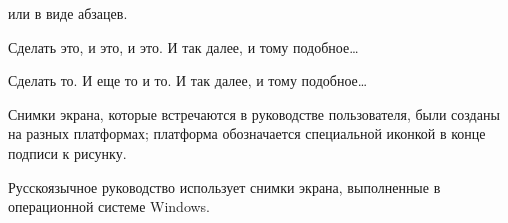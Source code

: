 или в виде абзацев.

\nix{} \osx{} Сделать это, и это, и это. И так далее, и тому подобное\ldots

\win{}Сделать то. И еще то и то. И так далее, и тому подобное\ldots

Снимки экрана, которые встречаются в руководстве пользователя, были
созданы на разных платформах; платформа обозначается специальной иконкой
в конце подписи к рисунку.

Русскоязычное руководство использует снимки экрана, выполненные в
операционной системе Windows.
